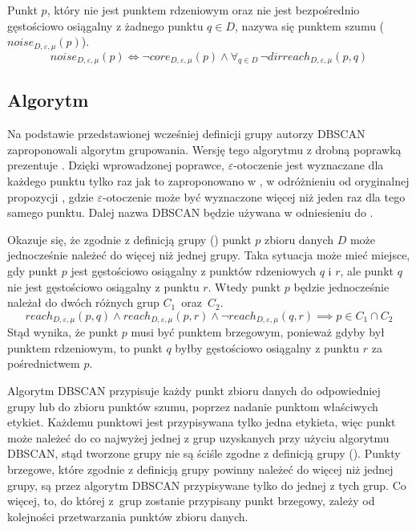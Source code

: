 \newline
Punkt $ p $, który nie jest punktem rdzeniowym oraz nie jest bezpośrednio gęstościowo osiągalny z żadnego punktu $q \in D$, nazywa się punktem szumu ($ noise_{D,\varepsilon,\mu}(p) $). 
\begin{equation}
	noise_{D,\varepsilon,\mu}(p) \iff \neg core_{D,\varepsilon,\mu}(p) \land \forall_{q\in D}\,\neg dirreach_{D,\varepsilon,\mu}(p, q)
\end{equation}

\subsection{Algorytm}
Na podstawie przedstawionej wcześniej definicji grupy autorzy DBSCAN zaproponowali algorytm grupowania. Wersję tego algorytmu z drobną poprawką prezentuje . Dzięki wprowadzonej poprawce, $ \varepsilon $-otoczenie jest wyznaczane dla każdego punktu tylko raz jak to zaproponowano w \cite{fasterdbscan}, w odróżnieniu od oryginalnej propozycji \cite{dbscan}, gdzie $ \varepsilon $-otoczenie może być wyznaczone więcej niż jeden raz dla tego samego punktu. Dalej nazwa DBSCAN będzie używana w odniesieniu do .

Okazuje się, że zgodnie z definicją grupy () punkt $ p $ zbioru danych $ D $ może jednocześnie należeć do więcej niż jednej grupy. Taka sytuacja może mieć miejsce, gdy punkt $ p $ jest gęstościowo osiągalny z punktów rdzeniowych $ q $ i $ r $, ale punkt $ q $ nie jest gęstościowo osiągalny z punktu $ r $. Wtedy punkt $ p $ będzie jednocześnie należał do dwóch różnych grup \mbox{$ C_1 $ oraz $ C_2 $}.
\begin{equation}
  reach_{D,\varepsilon,\mu}(p, q) \land reach_{D,\varepsilon,\mu}(p, r) \land 
  \neg reach_{D,\varepsilon,\mu}(q, r) \implies
  p \in C_1 \cap C_2
\end{equation}
Stąd wynika, że punkt $ p $ musi być punktem brzegowym, ponieważ gdyby był punktem rdzeniowym, to punkt $ q $ byłby gęstościowo osiągalny z punktu $ r $ za pośrednictwem $ p $.

Algorytm DBSCAN przypisuje każdy punkt zbioru danych do odpowiedniej grupy lub do zbioru punktów szumu, poprzez nadanie punktom właściwych etykiet. Każdemu punktowi jest przypisywana tylko jedna etykieta, więc punkt może należeć do co najwyżej jednej z grup uzyskanych przy użyciu algorytmu DBSCAN, stąd tworzone grupy nie są ściśle zgodne z definicją grupy (). Punkty brzegowe, które zgodnie z definicją grupy powinny należeć do więcej niż jednej grupy, są przez algorytm DBSCAN przypisywane tylko do jednej z tych grup. Co więcej, to, do której \mbox{z grup} zostanie przypisany punkt brzegowy, zależy od kolejności przetwarzania punktów zbioru danych.

